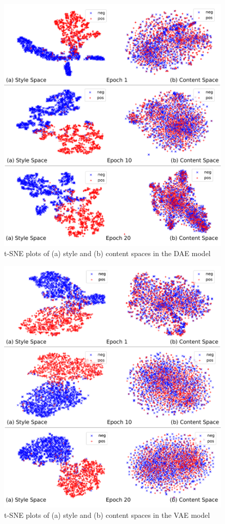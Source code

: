 \begin{figure}[ht]
	\includegraphics[width=\linewidth]{images/dae-latent-spaces}
	\caption{t-SNE plots of (a) style and (b) content spaces in the DAE model}
	\label{fig:dae-tsne}
\end{figure}

\begin{figure}[ht]
	\includegraphics[width=\linewidth]{images/vae-latent-spaces}
	\caption{t-SNE plots of (a) style and (b) content spaces in the VAE model}
	\label{fig:vae-tsne}
\end{figure}

